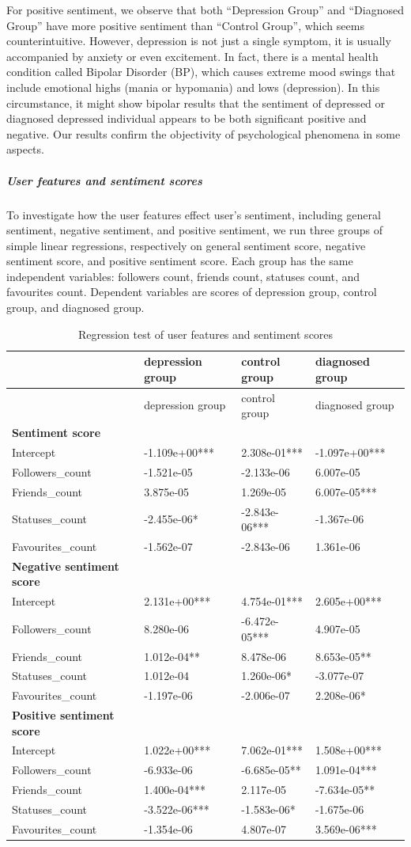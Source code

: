 \documentclass[]{article}
\let\oldsubparagraph\subparagraph
\renewcommand{\subparagraph}[1]{\oldsubparagraph{#1}\mbox{}}
\begin{document}
For positive sentiment, we observe that both ``Depression Group'' and
``Diagnosed Group'' have more positive sentiment than ``Control Group'',
which seems counterintuitive. However, depression is not just a single
symptom, it is usually accompanied by anxiety or even excitement. In
fact, there is a mental health condition called Bipolar Disorder (BP),
which causes extreme mood swings that include emotional highs (mania or
hypomania) and lows (depression). In this circumstance, it might show
bipolar results that the sentiment of depressed or diagnosed depressed
individual appears to be both significant positive and negative. Our
results confirm the objectivity of psychological phenomena in some
aspects.

\hypertarget{user-features-and-sentiment-scores}{%
\subparagraph{User features and sentiment
scores}\label{user-features-and-sentiment-scores}}

To investigate how the user features effect user's sentiment, including
general sentiment, negative sentiment, and positive sentiment, we run
three groups of simple linear regressions, respectively on general
sentiment score, negative sentiment score, and positive sentiment score.
Each group has the same independent variables: followers count, friends
count, statuses count, and favourites count. Dependent variables are
scores of depression group, control group, and diagnosed group.

\begin{longtable}[]{@{}llll@{}}
\caption{Regression test of user features and sentiment
scores}\tabularnewline
\toprule
& depression group & control group & diagnosed group\tabularnewline
\midrule
\endfirsthead
\toprule
& depression group & control group & diagnosed group\tabularnewline
\midrule
\endhead
\textbf{Sentiment score} & & &\tabularnewline
Intercept & -1.109e+00*** & 2.308e-01*** & -1.097e+00***\tabularnewline
Followers\_count & -1.521e-05 & -2.133e-06 & 6.007e-05\tabularnewline
Friends\_count & 3.875e-05 & 1.269e-05 & 6.007e-05***\tabularnewline
Statuses\_count & -2.455e-06* & -2.843e-06*** &
-1.367e-06\tabularnewline
Favourites\_count & -1.562e-07 & -2.843e-06 & 1.361e-06\tabularnewline
\textbf{Negative sentiment score} & & &\tabularnewline
Intercept & 2.131e+00*** & 4.754e-01*** & 2.605e+00***\tabularnewline
Followers\_count & 8.280e-06 & -6.472e-05*** & 4.907e-05\tabularnewline
Friends\_count & 1.012e-04** & 8.478e-06 & 8.653e-05**\tabularnewline
Statuses\_count & 1.012e-04 & 1.260e-06* & -3.077e-07\tabularnewline
Favourites\_count & -1.197e-06 & -2.006e-07 & 2.208e-06*\tabularnewline
\textbf{Positive sentiment score} & & &\tabularnewline
Intercept & 1.022e+00*** & 7.062e-01*** & 1.508e+00***\tabularnewline
Followers\_count & -6.933e-06 & -6.685e-05** &
1.091e-04***\tabularnewline
Friends\_count & 1.400e-04*** & 2.117e-05 & -7.634e-05**\tabularnewline
Statuses\_count & -3.522e-06*** & -1.583e-06* &
-1.675e-06\tabularnewline
Favourites\_count & -1.354e-06 & 4.807e-07 & 3.569e-06***\tabularnewline
\bottomrule
\end{longtable}
\end{document}
